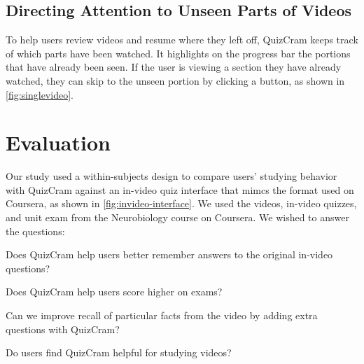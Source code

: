 \documentclass{sigchi}
\begin{document}

\subsection{Directing Attention to Unseen Parts of Videos}

To help users review videos and resume where they left off, QuizCram keeps track of which parts have been watched. It highlights on the progress bar the portions that have already been seen. If the user is viewing a section they have already watched, they can skip to the unseen portion by clicking a button, as shown in \autoref{fig:singlevideo}. %

\section{Evaluation}
Our study used a within-subjects design to compare users' studying behavior with QuizCram against an in-video quiz interface that mimcs the format used on Coursera, as shown in \autoref{fig:invideo-interface}. We used the videos, in-video quizzes, and unit exam from the Neurobiology course on Coursera. We wished to answer the questions:

\begin{compactitem}
\item Does QuizCram help users better remember answers to the original in-video questions?
\item Does QuizCram help users score higher on exams?
\item Can we improve recall of particular facts from the video by adding extra questions with QuizCram?
\item Do users find QuizCram helpful for studying videos?
\end{compactitem}
\end{document}
